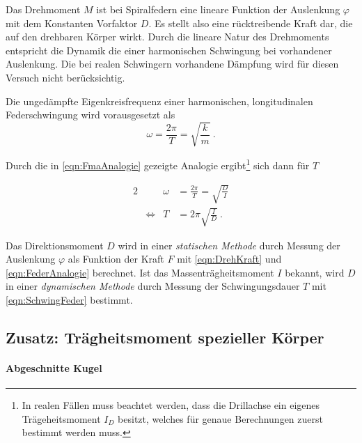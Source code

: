 Das Drehmoment $M$ ist bei Spiralfedern eine lineare Funktion der Auslenkung $\varphi$ mit dem Konstanten Vorfaktor $D$.
Es stellt also eine rücktreibende Kraft dar, die auf den drehbaren Körper wirkt.
Durch die lineare Natur des Drehmoments entspricht die Dynamik die einer harmonischen Schwingung bei vorhandener Auslenkung.
Die bei realen Schwingern vorhandene Dämpfung wird für diesen Versuch nicht berücksichtig.

Die ungedämpfte Eigenkreisfrequenz einer harmonischen, longitudinalen Federschwingung wird vorausgesetzt als 
\begin{equation*}
    \omega = \frac{2\pi}{T} = \sqrt{\frac{k}{m}}\:.
\end{equation*}

Durch die in \eqref{eqn:FmaAnalogie} gezeigte Analogie ergibt\footnote{In realen Fällen muss beachtet werden, dass die Drillachse ein eigenes Trägeheitsmoment $I_D$ besitzt, welches für genaue Berechnungen zuerst bestimmt werden muss.} sich dann für $T$

\begin{alignat}{2}
    &       & \omega    & = \frac{2\pi}{T} = \sqrt{\frac{D}{I}}  \\
    & \iff  & T         & = 2\pi \sqrt{\frac{I}{D}}\:.
    \label{eqn:SchwingFeder}
\end{alignat}

Das Direktionsmoment $D$ wird in einer \textit{statischen Methode} durch Messung der Auslenkung $\varphi$ als Funktion der Kraft $F$ mit \eqref{eqn:DrehKraft} und \eqref{eqn:FederAnalogie}
berechnet. Ist das Massenträgheitsmoment $I$ bekannt, wird $D$ in einer \textit{dynamischen Methode} durch Messung der Schwingungsdauer $T$ mit \eqref{eqn:SchwingFeder}
bestimmt.

\subsection{Zusatz: Trägheitsmoment spezieller Körper}
\label{sub:Trägheitsmoment}

\paragraph{Abgeschnitte Kugel}

